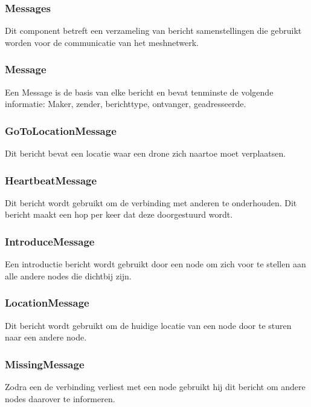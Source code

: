 \documentclass[a4paper, 11pt, oneside]{report}
\begin{document}
\subsubsection{Messages}
\label{architectural:subcomponenten:Messages}
Dit component betreft een verzameling van bericht samenstellingen die gebruikt worden voor de communicatie van het meshnetwerk.

\subsubsection{Message}
\label{architectural:subcomponenten:Message}
Een Message is de basis van elke bericht en bevat tenminste de volgende informatie:  Maker, zender, berichttype, ontvanger, geadresseerde. 
\subsubsection{GoToLocationMessage}
\label{architectural:subcomponenten:GoToLocationMessage}
Dit bericht bevat een locatie waar een drone zich naartoe moet verplaatsen.

\subsubsection{HeartbeatMessage}
\label{architectural:subcomponenten:HeartbeatMessage}
Dit bericht wordt gebruikt om de verbinding met anderen te onderhouden. Dit bericht maakt een hop per keer dat deze doorgestuurd wordt.

\subsubsection{IntroduceMessage}
\label{architectural:subcomponenten:IntroduceMessage}
Een introductie bericht wordt gebruikt door een node om zich voor te stellen aan alle andere nodes die dichtbij zijn. 

\subsubsection{LocationMessage}
\label{architectural:subcomponenten:LocationMessage}
Dit bericht wordt gebruikt om de huidige locatie van een node door te sturen naar een andere node.

\subsubsection{MissingMessage}
\label{architectural:subcomponenten:MissingMessage}
Zodra een  de verbinding verliest met een node gebruikt hij dit bericht om andere nodes daarover te informeren.
\end{document}
